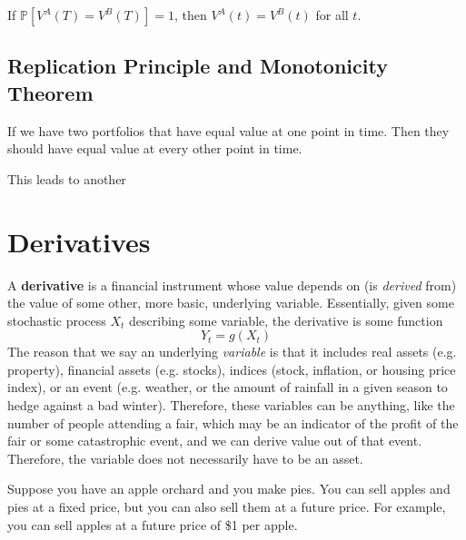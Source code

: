 \documentclass{article}
\begin{document}
    \begin{corollary}[Equality]
      If $\mathbb{P}[V^A (T) = V^B (T)] = 1$, then $V^A (t) = V^B (t)$ for all $t$. 
    \end{corollary}

  \subsection{Replication Principle and Monotonicity Theorem}

    \begin{theorem}
      If we have two portfolios that have equal value at one point in time. Then they should have equal value at every other point in time. 
    \end{theorem}

    This leads to another 

\section{Derivatives}

  \begin{definition}[Derivatives]
    A \textbf{derivative} is a financial instrument whose value depends on (is \textit{derived} from) the value of some other, more basic, underlying variable. Essentially, given some stochastic process $X_t$ describing some variable, the derivative is some function 
    \begin{equation}
      Y_t = g(X_t)
    \end{equation}
    The reason that we say an underlying \textit{variable} is that it includes real assets (e.g. property), financial assets (e.g. stocks), indices (stock, inflation, or housing price index), or an event (e.g. weather, or the amount of rainfall in a given season to hedge against a bad winter). Therefore, these variables can be anything, like the number of people attending a fair, which may be an indicator of the profit of the fair or some catastrophic event, and we can derive value out of that event. Therefore, the variable does not necessarily have to be an asset. 
  \end{definition}

  \begin{example} 
    Suppose you have an apple orchard and you make pies. You can sell apples and pies at a fixed price, but you can also sell them at a future price. For example, you can sell apples at a future price of \$1 per apple. 
  \end{example}
\end{document}
